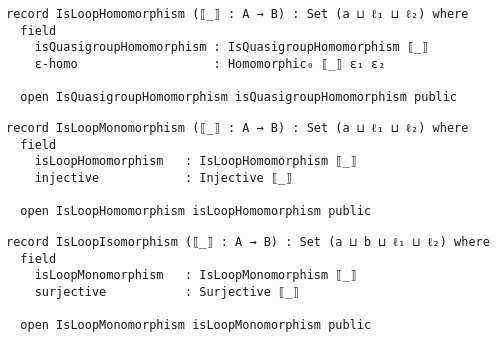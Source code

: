 \begin{comment}
module LoopMorphisms (L\textsubscript{1} : RawLoop a ℓ\textsubscript{1}) (L\textsubscript{2} : RawLoop b ℓ\textsubscript{2}) where

  open RawLoop L\textsubscript{1} renaming (Carrier to A; ∙-rawMagma to ∙-rawMagma\textsubscript{1};
                            \textbackslash\textbackslash-rawMagma to \textbackslash\textbackslash-rawMagma\textsubscript{1}; //-rawMagma to //-rawMagma\textsubscript{1};
                             _≈_ to _≈\textsubscript{1}_; _∙_ to _∙\textsubscript{1}_; _\textbackslash\textbackslash_ to _\textbackslash\textbackslash\textsubscript{1}_; _//_ to _//\textsubscript{1}_; ε to ε\textsubscript{1})
  open RawLoop L\textsubscript{2} renaming (Carrier to B; ∙-rawMagma to ∙-rawMagma\textsubscript{2};
                            \textbackslash\textbackslash-rawMagma to \textbackslash\textbackslash-rawMagma\textsubscript{2}; //-rawMagma to //-rawMagma\textsubscript{2};
                            _≈_ to _≈\textsubscript{2}_; _∙_ to _∙\textsubscript{2}_; _\textbackslash\textbackslash_ to _\textbackslash\textbackslash\textsubscript{2}_; _//_ to _//\textsubscript{2}_ ; ε to ε\textsubscript{2})
  open MorphismDefinitions A B _≈\textsubscript{2}_
  open FunctionDefinitions _≈\textsubscript{1}_ _≈\textsubscript{2}_

  open QuasigroupMorphisms (RawLoop.rawQuasigroup L\textsubscript{1}) (RawLoop.rawQuasigroup L\textsubscript{2})
\end{comment}
\begin{verbatim}
record IsLoopHomomorphism (⟦_⟧ : A → B) : Set (a ⊔ ℓ₁ ⊔ ℓ₂) where
  field
    isQuasigroupHomomorphism : IsQuasigroupHomomorphism ⟦_⟧
    ε-homo                   : Homomorphic₀ ⟦_⟧ ε₁ ε₂

  open IsQuasigroupHomomorphism isQuasigroupHomomorphism public
\end{verbatim}
\begin{verbatim}
record IsLoopMonomorphism (⟦_⟧ : A → B) : Set (a ⊔ ℓ₁ ⊔ ℓ₂) where
  field
    isLoopHomomorphism   : IsLoopHomomorphism ⟦_⟧
    injective            : Injective ⟦_⟧

  open IsLoopHomomorphism isLoopHomomorphism public
\end{verbatim}
\begin{verbatim}  
record IsLoopIsomorphism (⟦_⟧ : A → B) : Set (a ⊔ b ⊔ ℓ₁ ⊔ ℓ₂) where
  field
    isLoopMonomorphism   : IsLoopMonomorphism ⟦_⟧
    surjective           : Surjective ⟦_⟧

  open IsLoopMonomorphism isLoopMonomorphism public
\end{verbatim}
